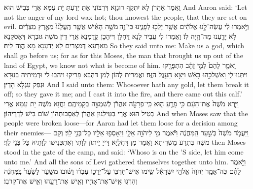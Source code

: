 {וַאֲמַר אַהֲרֹן לָא יִתְקַף רוּגְזָא דְּרִבּוֹנִי אַתְּ יְדַעְתְּ יָת עַמָּא אֲרֵי בְּבִישׁ הוּא׃}
{And Aaron said: ‘Let not the anger of my lord wax hot; thou knowest the people, that they are set on evil.}{}
{וַיֹּ֣אמְרוּ לִ֔י עֲשֵׂה־לָ֣נוּ אֱלֹהִ֔ים אֲשֶׁ֥ר יֵלְכ֖וּ לְפָנֵ֑ינוּ כִּי־זֶ֣ה \legarmeh  מֹשֶׁ֣ה הָאִ֗ישׁ אֲשֶׁ֤ר הֶֽעֱלָ֙נוּ֙ מֵאֶ֣רֶץ מִצְרַ֔יִם לֹ֥א יָדַ֖עְנוּ מֶה־הָ֥יָה לֽוֹ׃}
{וַאֲמַרוּ לִי עֲבֵיד לַנָא דַּחְלָן דִּיהָכָן קֳדָמַנָא אֲרֵי דֵין מֹשֶׁה גּוּבְרָא דְּאַסְּקַנָא מֵאַרְעָא דְּמִצְרַיִם לָא יְדַעְנָא מָא הֲוָה לֵיהּ׃}
{So they said unto me: Make us a god, which shall go before us; for as for this Moses, the man that brought us up out of the land of Egypt, we know not what is become of him.}{}
{וָאֹמַ֤ר לָהֶם֙ לְמִ֣י זָהָ֔ב הִתְפָּרָ֖קוּ וַיִּתְּנוּ־לִ֑י וָאַשְׁלִכֵ֣הוּ בָאֵ֔שׁ וַיֵּצֵ֖א הָעֵ֥גֶל הַזֶּֽה׃
}
{וַאֲמַרִית לְהוֹן לְמַן דַּהְבָּא פָּרִיקוּ וִיהַבוּ לִי וּרְמֵיתֵיהּ בְּנוּרָא וּנְפַק עִגְלָא הָדֵין׃}
{And I said unto them: Whosoever hath any gold, let them break it off; so they gave it me; and I cast it into the fire, and there came out this calf.’}{}
{וַיַּ֤רְא מֹשֶׁה֙ אֶת־הָעָ֔ם כִּ֥י פָרֻ֖עַ ה֑וּא כִּֽי־פְרָעֹ֣ה אַהֲרֹ֔ן לְשִׁמְצָ֖ה בְּקָמֵיהֶֽם׃
}
{וַחֲזָא מֹשֶׁה יָת עַמָּא אֲרֵי בְּטִיל הוּא אֲרֵי בַּטֵּילִנּוּן אַהֲרֹן לְאַסָּבוּתְהוֹן שׁוֹם בִּישׁ לְדָרֵיהוֹן׃}
{And when Moses saw that the people were broken loose—for Aaron had let them loose for a derision among their enemies—}{}
{וַיַּעֲמֹ֤ד מֹשֶׁה֙ בְּשַׁ֣עַר הַֽמַּחֲנֶ֔ה וַיֹּ֕אמֶר מִ֥י לַיהֹוָ֖ה אֵלָ֑י וַיֵּאָסְפ֥וּ אֵלָ֖יו כׇּל־בְּנֵ֥י לֵוִֽי׃
}
{וְקָם מֹשֶׁה בִּתְרַע מַשְׁרִיתָא וַאֲמַר מַן דָּחֲלַיָּא דַּייָ יֵיתוֹן לְוָתִי וְאִתְכְּנִישׁוּ לְוָתֵיהּ כָּל בְּנֵי לֵוִי׃}
{then Moses stood in the gate of the camp, and said: ‘Whoso is on the \lord’S side, let him come unto me.’ And all the sons of Levi gathered themselves together unto him.}{}
{וַיֹּ֣אמֶר לָהֶ֗ם כֹּֽה־אָמַ֤ר יְהֹוָה֙ אֱלֹהֵ֣י יִשְׂרָאֵ֔ל שִׂ֥ימוּ אִישׁ־חַרְבּ֖וֹ עַל־יְרֵכ֑וֹ עִבְר֨וּ וָשׁ֜וּבוּ מִשַּׁ֤עַר לָשַׁ֙עַר֙ בַּֽמַּחֲנֶ֔ה וְהִרְג֧וּ אִֽישׁ־אֶת־אָחִ֛יו וְאִ֥ישׁ אֶת־רֵעֵ֖הוּ וְאִ֥ישׁ אֶת־קְרֹבֽוֹ׃
}

